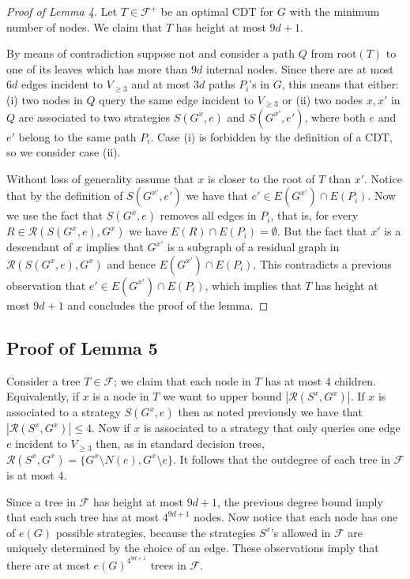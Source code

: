 \documentclass[12pt]{article}
\newcommand{\ro}[1]{\textrm{root}(#1)}
\begin{document}
		\begin{proof}[Proof of Lemma 4]
			Let $T \in \mathcal{F}^+$ be an optimal CDT for $G$ with the minimum number of nodes. We claim that $T$ has height at most $9d + 1$.
			
			By means of contradiction suppose not and consider a path $Q$ from $\ro{T}$ to one of its leaves which has more than $9d$ internal nodes. Since there are at most $6d$ edges incident to $V_{\ge 3}$ and at most $3d$ paths $P_i$'s in $G$, this means that either: (i) two nodes in $Q$ query the same edge incident to $V_{\ge 3}$ or (ii) two nodes $x, x'$ in $Q$ are associated to two strategies $S(G^x, e)$ and $S(G^{x'}, e')$, where both $e$ and $e'$ belong to the same path $P_i$. Case (i) is forbidden by the definition of a CDT, so we consider case (ii). 
			
			Without loss of generality assume that $x$ is closer to the root of $T$ than $x'$. Notice that by the definition of $S(G^{x'}, e')$ we have that $e' \in E(G^{x'}) \cap E(P_i)$. Now we use the fact that $S(G^x,e)$ removes all edges in $P_i$, that is, for every $R \in \mathcal{R}(S(G^x,e), G^x)$ we have $E(R) \cap E(P_i) = \emptyset$. But the fact that $x'$ is a descendant of $x$ implies that $G^{x'}$ is a subgraph of a residual graph in $\mathcal{R}(S(G^x,e), G^x)$ and hence $E(G^{x'}) \cap E(P_i)$. This contradicts a previous observation that $e' \in E(G^{x'}) \cap E(P_i)$, which implies that $T$ has height at most $9d + 1$ and concludes the proof of the lemma.  
		\end{proof}
		

	\subsection{Proof of Lemma 5}
	
			Consider a tree $T \in \mathcal{F}$; we claim that each node in $T$ has at most 4 children. Equivalently, if $x$ is a node in $T$ we want to upper bound $|\mathcal{R}(S^x, G^x)|$. If $x$ is associated to a strategy $S(G^x, e)$ then as noted previously we have that $|\mathcal{R}(S^x, G^x)| \le 4$. Now if $x$ is associated to a strategy that only queries one edge $e$ incident to $V_{\ge 3}$ then, as in standard decision trees, $\mathcal{R}(S^x, G^x) = \{G^x \setminus N(e), G^x \setminus e\}$. It follows that the outdegree of each tree in $\mathcal{F}$ is at most 4.
		
		Since a tree in $\mathcal{F}$ has height at most $9 d + 1$, the previous degree bound imply that each such tree has at most $4^{9 d + 1}$ nodes. Now notice that each node has one of $e(G)$ possible strategies, because the strategies $S^x$'s allowed in $\mathcal{F}$ are uniquely determined by the choice of an edge. These observations imply that there are at most $e(G)^{4^{9d + 1}}$ trees in $\mathcal{F}$.
		
\end{document}
